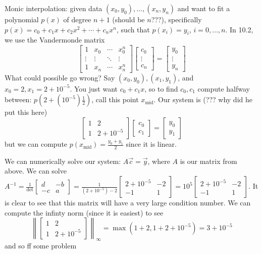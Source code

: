 \documentclass{article}
\theoremstyle{plain}
\theoremstyle{remark}
\begin{document}
Monic interpolation: given data $(x_0,y_0),\dots,(x_n,y_n)$
and want to fit a polynomial $p(x)$ of degree $n+1$ (should be $n$???),
specifically $p(x) = c_0 + c_1 x + c_2 x^2 + \cdots + c_nx^n$, such that
$p(x_i) = y_i$, $i = 0,\dots,n$.
In 10.2, we use the Vandermonde matrix
\[
	\begin{bmatrix}
		1 & x_0 & \cdots & x_0^n\\
		\vdots & \vdots & \ddots & \vdots\\
		1 & x_n & \cdots & x_n^n
	\end{bmatrix}
	\begin{bmatrix} c_0 \\ \vdots \\ c_n \end{bmatrix} = 
	\begin{bmatrix} y_0 \\ \vdots \\ y_n \end{bmatrix}
\]
What could possible go wrong?
Say $(x_0,y_0),(x_1,y_1)$, and $x_0 = 2, x_1 = 2+ 10^{-5}$.
You just want $c_0 + c_1 x$, so to find $c_0,c_1$ compute
halfway between: $p(2 + (10^{-5})\frac12)$,
call this point $x_{\text{mid}}$.
Our system is (??? why did he put this here)
\[
	\begin{bmatrix} 1 & 2 \\ 1 & 2 + 10^{-5} \end{bmatrix}
	\begin{bmatrix} c_0 \\ c_1 \end{bmatrix}
	= \begin{bmatrix} y_0 \\ y_1 \end{bmatrix}
\]
but we can compute $p(x_{\text{mid}}) = \frac{y_0 + y_1}{2}$ since it is linear.

We can numerically solve our system:
$A \vec{c} = \vec{y}$, where $A$ is our matrix from above.
We can solve $A^{-1} = \frac{1}{\det}\begin{bmatrix} d & -b \\ -c & a \end{bmatrix}
= \frac{1}{(2+10^{-5})-2}\begin{bmatrix} 2 + 10^{-5} & -2 \\ -1 & 1 \end{bmatrix}
= 10^5\begin{bmatrix} 2 + 10^{-5} & -2 \\ -1 & 1 \end{bmatrix}$.
It is clear to see that this matrix will have a very large condition number.
We can compute the infinty norm (since it is easiest) to see
\[
	\left\lVert \begin{bmatrix} 1 & 2 \\ 1 & 2 + 10^{-5}\end{bmatrix}\right\rVert_\infty
	= \max(1 + 2, 1 + 2 + 10^{-5}) = 3 + 10^{-5}
\]
and so ff some problem
\end{document}
